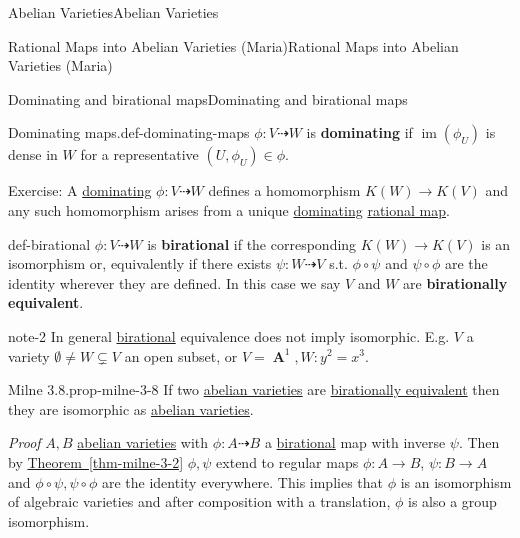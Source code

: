 \documentclass[10pt,]{book}
\makeatletter
\newcommand{\terminology}[1]{\textbf{#1}}
\renewcommand*{\proofname}{Proof}
\renewenvironment{proof}[1][\proofname]{\par
  \pushQED{\qed}%
  \normalfont \topsep6\p@\@plus6\p@\relax
  \trivlist
  \item\relax
    {\itshape
    #1\@addpunct{.}}\hspace\labelsep\ignorespaces
}{%
  \popQED\endtrivlist\@endpefalse
}
\numberwithin{equation}{section}
\DeclareMathOperator{\im}{im}
\DeclareMathOperator{\aff}{\mathbf{A}}
\makeatother
\begin{document}
\begin{chapterptx}{Abelian Varieties}{}{Abelian Varieties}{}{}
\begin{sectionptx}{Rational Maps into Abelian Varieties (Maria)}{}{Rational Maps into Abelian Varieties (Maria)}{}{}
\typeout{************************************************}
%
\begin{subsectionptx}{Dominating and birational maps}{}{Dominating and birational maps}{}{}\label{subsection-9}
\begin{definition}{Dominating maps.}{def-dominating-maps}%
\hypertarget{p-96}{}%
\(\phi\colon V \dashrightarrow W\) is \terminology{dominating} if \(\im (\phi_U)\) is dense in \(W\) for a representative \((U,\phi_U)\in \phi\).%
\end{definition}
\hypertarget{p-97}{}%
Exercise: A \hyperref[def-dominating-maps]{dominating} \(\phi\colon V\dashrightarrow W\) defines a homomorphism \(K(W) \to K(V)\) and any such homomorphism arises from a unique \hyperref[def-dominating-maps]{dominating} \hyperref[def-rational-map]{rational map}.%
\begin{definition}{}{def-birational}%
\hypertarget{p-98}{}%
\(\phi\colon V \dashrightarrow W\) is \terminology{birational} if the corresponding \(K(W)\to K(V)\) is an isomorphism or, equivalently if there exists \(\psi\colon W\dashrightarrow V \) s.t. \(\phi\circ \psi\) and \(\psi\circ\phi\) are the identity wherever they are defined. In this case we say \(V\) and \(W\) are \terminology{birationally equivalent}.%
\end{definition}
\begin{note}{}{note-2}%
\hypertarget{p-99}{}%
In general \hyperref[def-birational]{birational} equivalence does not imply isomorphic. E.g. \(V\) a variety \(\emptyset \ne W\subsetneq V\) an open subset, or \(V= \aff^1, W \colon y^2 =x^3\).%
\end{note}
\begin{theorem}{Milne 3.8.}{}{prop-milne-3-8}%
\hypertarget{p-100}{}%
If two \hyperref[def-buntes-abvar]{abelian varieties} are \hyperref[def-birational]{birationally equivalent} then they are isomorphic as \hyperref[def-buntes-abvar]{abelian varieties}.%
\end{theorem}
\begin{proof}\hypertarget{proof-16}{}
\hypertarget{p-101}{}%
\(A,B\) \hyperref[def-buntes-abvar]{abelian varieties} with \(\phi \colon A\dashrightarrow B\) a \hyperref[def-birational]{birational} map with inverse \(\psi\). Then by \hyperref[thm-milne-3-2]{Theorem~\ref{thm-milne-3-2}} \(\phi ,\psi\) extend to regular maps   \(\phi\colon A \to B \), \(\psi\colon B\to A\) and \(\phi\circ\psi,\psi\circ\phi\) are  the identity everywhere. This implies that \(\phi\) is an isomorphism of  algebraic varieties and after composition with a translation, \(\phi\) is also a group isomorphism.%

\end{proof}
\end{subsectionptx}
\end{sectionptx}
\end{chapterptx}
\end{document}
